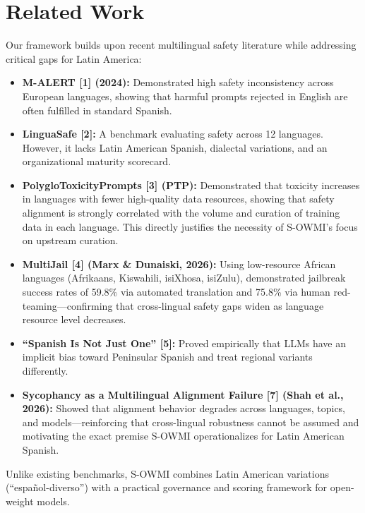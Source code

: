\documentclass[11pt,a4paper]{article}
\begin{document}
\section{Related Work}

Our framework builds upon recent multilingual safety literature while addressing critical
gaps for Latin America:

\begin{itemize}[leftmargin=1.5em, itemsep=2pt]
  \item \textbf{M-ALERT [1] (2024):} Demonstrated high safety inconsistency across European
    languages, showing that harmful prompts rejected in English are often fulfilled in
    standard Spanish.
  \item \textbf{LinguaSafe [2]:} A benchmark evaluating safety across 12 languages. However,
    it lacks Latin American Spanish, dialectal variations, and an organizational maturity
    scorecard.
  \item \textbf{PolygloToxicityPrompts [3] (PTP):} Demonstrated that toxicity increases in
    languages with fewer high-quality data resources, showing that safety alignment is
    strongly correlated with the volume and curation of training data in each language.
    This directly justifies the necessity of S-OWMI's focus on upstream curation.
  \item \textbf{MultiJail [4] (Marx \& Dunaiski, 2026):} Using low-resource African
    languages (Afrikaans, Kiswahili, isiXhosa, isiZulu), demonstrated jailbreak success
    rates of 59.8\% via automated translation and 75.8\% via human red-teaming---confirming
    that cross-lingual safety gaps widen as language resource level decreases.
  \item \textbf{``Spanish Is Not Just One'' [5]:} Proved empirically that LLMs have an
    implicit bias toward Peninsular Spanish and treat regional variants differently.
  \item \textbf{Sycophancy as a Multilingual Alignment Failure [7] (Shah et al., 2026):}
    Showed that alignment behavior degrades across languages, topics, and models---reinforcing
    that cross-lingual robustness cannot be assumed and motivating the exact premise S-OWMI
    operationalizes for Latin American Spanish.
\end{itemize}

Unlike existing benchmarks, S-OWMI combines Latin American variations (``español-diverso'')
with a practical governance and scoring framework for open-weight models.
\end{document}
